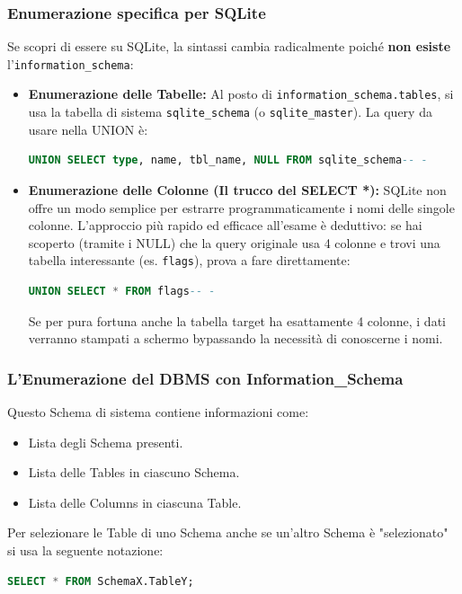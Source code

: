 \documentclass[12pt,a4paper]{report}
\begin{document}
	\subsubsection{Enumerazione specifica per SQLite}
	Se scopri di essere su SQLite, la sintassi cambia radicalmente poiché \textbf{non esiste} l'\texttt{information\_schema}:
	\begin{itemize}
		\item \textbf{Enumerazione delle Tabelle:} Al posto di \texttt{information\_schema.tables}, si usa la tabella di sistema \texttt{sqlite\_schema} (o \texttt{sqlite\_master}). La query da usare nella UNION è:
		\begin{lstlisting}[language=SQL]
			UNION SELECT type, name, tbl_name, NULL FROM sqlite_schema-- -
		\end{lstlisting}
		\item \textbf{Enumerazione delle Colonne (Il trucco del SELECT *):} SQLite non offre un modo semplice per estrarre programmaticamente i nomi delle singole colonne. L'approccio più rapido ed efficace all'esame è deduttivo: se hai scoperto (tramite i NULL) che la query originale usa 4 colonne e trovi una tabella interessante (es. \texttt{flags}), prova a fare direttamente:
		\begin{lstlisting}[language=SQL]
			UNION SELECT * FROM flags-- -
		\end{lstlisting}
		Se per pura fortuna anche la tabella target ha esattamente 4 colonne, i dati verranno stampati a schermo bypassando la necessità di conoscerne i nomi.
	\end{itemize}
	
	\subsubsection{L'Enumerazione del DBMS con Information\_Schema}
	Questo Schema di sistema contiene informazioni come:
	\begin{itemize}
		\item Lista degli Schema presenti.
		\item Lista delle Tables in ciascuno Schema.
		\item Lista delle Columns in ciascuna Table.
	\end{itemize}
	\begin{nota}
		Per selezionare le Table di uno Schema anche se un'altro Schema è "selezionato" si usa la seguente notazione:
		\begin{lstlisting}[language=SQL]
			SELECT * FROM SchemaX.TableY;
		\end{lstlisting}
	\end{nota}
	
\end{document}
